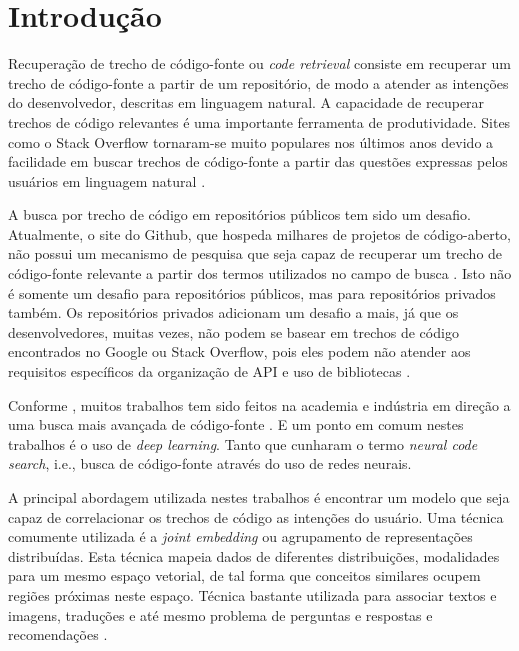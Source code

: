 \chapter{Introdução}
\label{cap:introducao}


Recuperação de trecho de código-fonte ou \textit{code retrieval} consiste em recuperar um trecho de código-fonte a partir de um repositório, de modo a atender as intenções do desenvolvedor, descritas em linguagem natural. A capacidade de recuperar trechos de código relevantes é uma importante ferramenta de produtividade. Sites como o Stack Overflow tornaram-se muito populares nos últimos anos devido a facilidade em buscar trechos de código-fonte a partir das questões expressas pelos usuários em linguagem natural \citep{cambronero-deep-learning-code-search:2019}. 

A busca por trecho de código em repositórios públicos tem sido um desafio. Atualmente, o site do Github, que hospeda milhares de projetos de código-aberto, não possui um mecanismo de pesquisa que
seja capaz de recuperar um trecho de código-fonte relevante a partir dos termos utilizados no campo de busca \citep{cambronero-deep-learning-code-search:2019}. Isto não é somente um desafio para repositórios públicos, mas para repositórios privados também. Os repositórios privados adicionam um desafio a mais, já que os desenvolvedores, muitas vezes, não podem se basear em trechos de código encontrados no Google ou Stack Overflow, pois eles podem não atender aos requisitos específicos da organização de API e uso de bibliotecas \citep{cambronero-deep-learning-code-search:2019}.

Conforme \cite{cambronero-deep-learning-code-search:2019}, muitos trabalhos tem sido feitos na academia e indústria em direção a uma busca mais avançada de código-fonte \citep{Gu-deep-code-search:2018, yao-2018, iyer-etal-2016-summarizing, Allamanis-bimodal-source-code-natural-language:2015, Chen-bi-variational-autoencoder:2018, Sachdev-neural-code-search:2018, cambronero-deep-learning-code-search:2019}. E um ponto em comum nestes trabalhos é o uso de \textit{deep learning}. Tanto que \cite{cambronero-deep-learning-code-search:2019} cunharam o termo \textit{neural code search}, i.e., busca de código-fonte através do uso de redes neurais. 

A principal abordagem utilizada nestes trabalhos é encontrar um \gls{modelo} que seja capaz de correlacionar os trechos de código as intenções do usuário. Uma técnica comumente utilizada é a \textit{joint embedding} ou agrupamento de representações distribuídas. Esta técnica mapeia dados de diferentes distribuições, modalidades para um mesmo espaço vetorial, de tal forma que conceitos similares ocupem regiões próximas neste espaço. Técnica bastante utilizada para associar textos e imagens, traduções e até mesmo problema de perguntas e respostas e recomendações \citep{lai-etal-2018-review, Zhang:2019:deep-learning-recommender-survey}.

